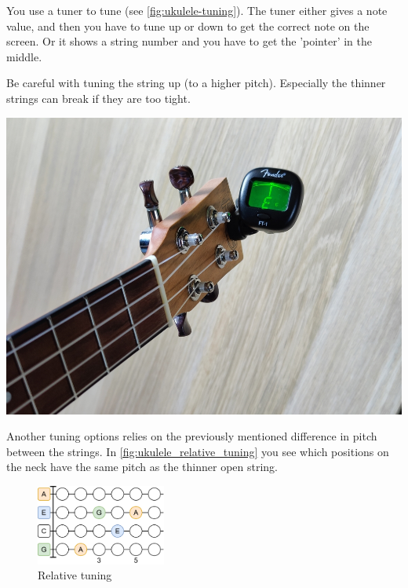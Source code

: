 \begin{minipage}{0.5\textwidth}
You use a tuner to tune (see \autoref{fig:ukulele-tuning}). The tuner either gives a note value, and then you have to tune up or down to get the correct note on the screen. Or it shows a string number and you have to get the 'pointer' in the middle.

Be careful with tuning the string up (to a higher pitch). Especially the thinner strings can break if they are too tight.
\end{minipage}
\hfill
\begin{minipage}{0.3\textwidth}
	\centering
	\includegraphics[width=\textwidth]{../../Images/ukulele-tuning.jpg}
	\label{fig:ukulele-tuning}
\end{minipage}

Another tuning options relies on the previously mentioned difference in pitch between the strings. In \autoref{fig:ukulele_relative_tuning} you see which positions on the neck have the same pitch as the thinner open string.

\begin{figure}[h]
	\centering
	\includegraphics[width=0.38\textwidth]{../../Images/UkuleleRelativeTuning.png}
	\caption{Relative tuning}
	\label{fig:ukulele_relative_tuning}
\end{figure}
